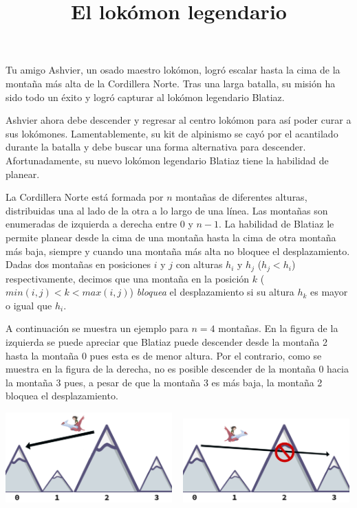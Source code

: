 \documentclass{oci}
\title{El lokómon legendario}
\begin{document}
\begin{problemDescription}

Tu amigo Ashvier, un osado maestro lokómon, logró escalar hasta la cima de la montaña más alta de
la Cordillera Norte.
Tras una larga batalla, su misión ha sido todo un éxito y logró capturar al lokómon legendario Blatiaz.

Ashvier ahora debe descender y regresar al centro lokómon
para así poder curar a sus lokómones.
Lamentablemente, su kit de alpinismo se cayó por el acantilado durante la batalla y debe buscar
una forma alternativa para descender.
Afortunadamente, su nuevo lokómon legendario Blatiaz tiene la habilidad de planear.

La Cordillera Norte está formada por $n$ montañas de diferentes alturas, distribuidas una al lado
de la otra a lo largo de una línea.
Las montañas son enumeradas de izquierda a derecha entre 0 y $n-1$.
La habilidad de Blatiaz le permite planear desde la cima de una montaña
hasta la cima de otra montaña más baja, siempre y cuando una montaña más alta no bloquee
el desplazamiento.
Dadas dos montañas en posiciones $i$ y $j$ con alturas $h_i$ y $h_j$ ($h_j < h_i$) respectivamente,
decimos que una montaña en la posición $k$ ($min(i, j) < k < max(i, j)$) \emph{bloquea} el
desplazamiento si su altura $h_k$ es mayor o igual que $h_i$.


A continuación se muestra un ejemplo para $n=4$ montañas.
En la figura de la izquierda se puede apreciar que Blatiaz puede descender desde la montaña 2
hasta la montaña 0 pues esta es de menor altura.
Por el contrario, como se muestra en la figura de la derecha, no es posible descender de la
montaña 0 hacia la montaña 3 pues, a pesar de que la montaña 3 es más baja, la montaña 2 bloquea el
desplazamiento.

\begin{center}
\includegraphics[width=0.48\textwidth]{allowed.png}
~
\includegraphics[width=0.48\textwidth]{disallowed.png}
\end{center}


\end{problemDescription}
\end{document}
